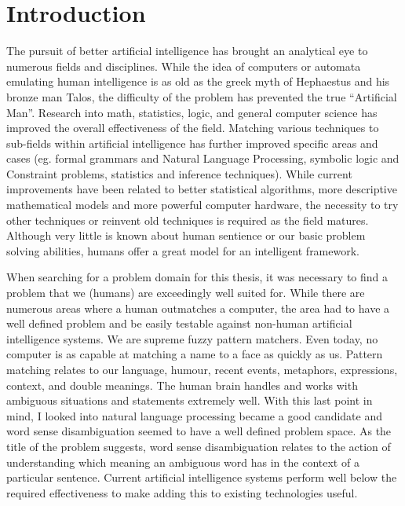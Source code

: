 \chapter{Introduction}

The pursuit of better artificial intelligence has brought an analytical eye to numerous fields and disciplines.  While the idea of computers or automata emulating human intelligence is as old as the greek myth of Hephaestus and his bronze man Talos\cite{TALOS}, the difficulty of the problem has prevented the true ``Artificial Man''.  Research into math, statistics, logic, and general computer science has improved the overall effectiveness of the field. Matching various techniques to sub-fields within artificial intelligence has further improved specific areas and cases (eg. formal grammars and Natural Language Processing, symbolic logic and Constraint problems, statistics and inference techniques). While current improvements have been related to better statistical algorithms, more descriptive mathematical models and more powerful computer hardware, the necessity to try other techniques or reinvent old techniques is required as the field matures.  Although very little is known about human sentience or our basic problem solving abilities, humans offer a great model for an intelligent framework.

When searching for a problem domain for this thesis, it was necessary to find a problem that we (humans) are exceedingly well suited for.  While there are numerous areas where a human outmatches a computer, the area had to have a well defined problem and be easily testable against non-human artificial intelligence systems.  We are supreme fuzzy pattern matchers.  Even today, no computer is as capable at matching a name to a face as quickly as us.  Pattern matching relates to our language, humour, recent events, metaphors, expressions, context, and double meanings. The human brain handles and works with ambiguous situations and statements extremely well.  With this last point in mind, I looked into natural language processing became a good candidate and word sense disambiguation seemed to have a well defined problem space.  As the title of the problem suggests, word sense disambiguation relates to the action of understanding which meaning an ambiguous word has in the context of a particular sentence. Current artificial intelligence systems perform well below the required effectiveness to make adding this to existing technologies useful.  

